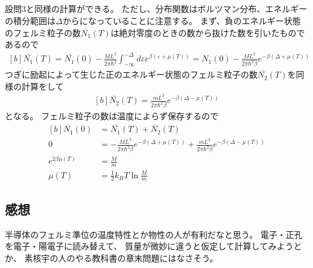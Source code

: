 \documentclass[../../master.tex]{subfiles}
\begin{document}
\subsection{}
設問3と同様の計算ができる。
ただし、分布関数はボルツマン分布、エネルギーの積分範囲は\(\Delta\)からになっていることに注意する。
まず、負のエネルギー状態のフェルミ粒子の数\(\bar{N_1}(T)\)は絶対零度のときの数から抜けた数を引いたものであるので
\begin{equation}\begin{aligned}[b]
    \bar{N_1}(T) = \bar{N_1}(0)-\frac{ML^2}{2\pi\hbar^2}\int_{-\infty}^{-\Delta}d\varepsilon e^{\beta(\varepsilon+\mu(T))}
    =N_1(0)-\frac{ML^2}{2\pi\hbar^2\beta}e^{-\beta(\Delta+\mu(T))}
\end{aligned}\end{equation}
つぎに励起によって生じた正のエネルギー状態のフェルミ粒子の数\(\bar{N_2}(T)\)を同様の計算をして
\begin{equation}\begin{aligned}[b]
    \bar{N_2}(T) = \frac{mL^2}{2\pi\hbar^2 \beta}e^{-\beta(\Delta-\mu(T))}
\end{aligned}\end{equation}
となる。
フェルミ粒子の数は温度によらず保存するので
\begin{equation}\begin{aligned}[b]
    \bar{N_1}(0) &= \bar{N_1}(T)+\bar{N_2}(T)\\
    0 &= -\frac{ML^2}{2\pi\hbar^2\beta}e^{-\beta(\Delta+\mu(T))}+\frac{mL^2}{2\pi\hbar^2\beta}e^{-\beta(\Delta-\mu(T))}\\
    e^{2\beta\mu(T)} &= \frac{M}{m}\\
    \mu(T) &= \frac{1}{2}k_BT\ln\frac{M}{m}
\end{aligned}\end{equation}


\subsection*{感想}
半導体のフェルミ準位の温度特性とか物性の人が有利だなと思う。
電子・正孔を電子・陽電子に読み替えて、
質量が微妙に違うと仮定して計算してみようとか、
素核宇の人のやる教科書の章末問題にはなさそう。
\end{document}
